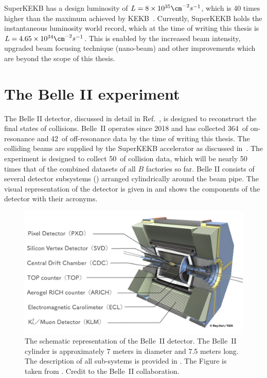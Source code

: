 SuperKEKB has a design luminosity of $L=8\times10^{35}\cm^{-2}s^{-1}$, which is 40 times higher than the maximum achieved by KEKB~\cite{Funakoshi:2022dai}.
Currently, SuperKEKB holds the instantaneous luminosity world record, which at the time of writing this thesis is $L = 4.65\times10^{34}\cm^{-2}s^{-1}$.
This is enabled by the increased beam intensity, upgraded beam focusing technique (nano-beam) and other improvements which are beyond the scope of this thesis.


\section{The Belle II experiment}\label{sec:belle2}
The Belle II detector, discussed in detail in Ref.~\cite{Belle-II:2010dht}, is designed to reconstruct the final states of \epem collisions.
Belle~II operates since 2018 and has collected 364~\invfb of on-resonance and 42~\invfb of off-resonance data by the time of writing this thesis.
The colliding beams are supplied by the SuperKEKB accelerator as discussed in~.
The experiment is designed to collect 50~\invab of collision data, which will be nearly 50 times that of the combined datasets of all $B$ factories so far.
Belle II consists of several detector subsystems () arranged cylindrically around the beam pipe. 
The visual representation of the detector is given in  and shows the components of the detector with their acronyms.
\begin{figure}[htbp!]
    \includegraphics[width=1\textwidth]{figures/experimental_setup/belle2.png}
    \caption{\label{fig:belle2_detector} The schematic representation of the Belle~II detector.
    The Belle~II cylinder is approximately 7 meters in diameter and 7.5 meters long.
    The description of all sub-systems is provided in .
    The Figure is taken from \cite{belle_2_picture}.
    Credit to the Belle~II collaboration.
    }
\end{figure}

